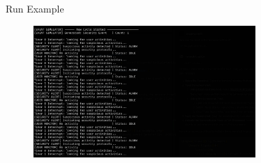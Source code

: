 \begin{frame}{Run Example}
    \begin{figure}[h]
        \centering
        \includegraphics[width=0.75\textwidth]{resources/images/run_example.png}
    \end{figure}
\end{frame}
